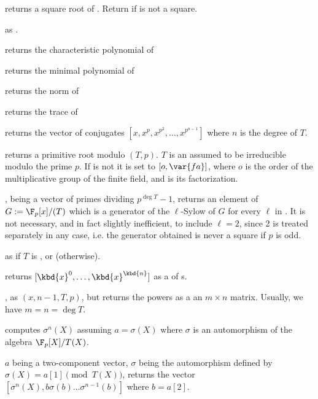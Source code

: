  returns a square root of .
Return  if  is not a square.

as .

 returns the characteristic
polynomial of 

 returns the minimal polynomial
of 

 returns the norm of 

 returns the trace of 

 returns the vector of conjugates
$[x,x^p,x^{p^2},\ldots,x^{p^{n-1}}]$ where $n$ is the degree of $T$.

 returns a primitive root modulo
$(T,p)$. $T$ is an  assumed to be irreducible modulo the prime
$p$. If  is not  it is set to $[o,\var{fa}]$, where $o$ is
the order of the multiplicative group of the finite field, and  is
its factorization.

,  being a vector of
primes dividing $p^{\deg T} - 1$, returns an element of $G:=\F_p[x]/(T)$
which is a generator of the $\ell$-Sylow of $G$ for every $\ell$ in
. It is not necessary, and in fact slightly inefficient, to include
$\ell=2$, since 2 is treated separately in any case, i.e. the generator
obtained is never a square if $p$ is odd.

 as
 if $T$ is ,
or  (otherwise).


 returns $[\kbd{x}^0,
\dots, \kbd{x}^\kbd{n}]$ as a  of s.

, as
$(x, n-1, T, p)$, but returns the powers as a an
$m\times n$ matrix. Usually, we have $m = n = \deg T$.

 computes $\sigma^n(X)$
assuming $a=\sigma(X)$ where $\sigma$ is an automorphism of the algebra
$\F_p[X]/T(X)$.

$a$ being a two-component vector,
$\sigma$ being the automorphism defined by $\sigma(X)=a[1]\pmod{T(X)}$,
returns the vector $[\sigma^n(X),b\sigma(b)\ldots\sigma^{n-1}(b)]$
where $b=a[2]$.

